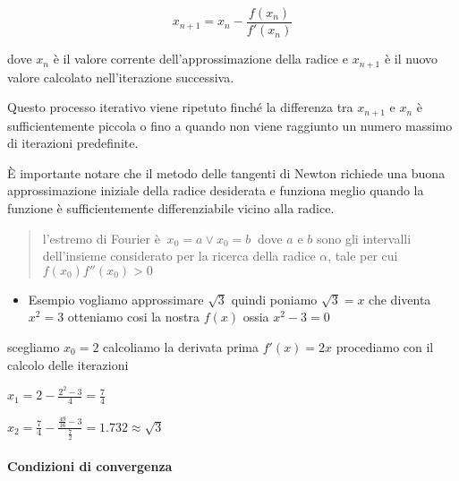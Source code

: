 \documentclass[
]{article}
\providecommand{\tightlist}{%
  \setlength{\itemsep}{0pt}\setlength{\parskip}{0pt}}
\begin{document}
\[
x_{n+1} = x_n - \frac{f(x_n)}{f'(x_n)}
\]

dove \(x_n\) è il valore corrente dell'approssimazione della radice e
\(x_{n+1}\) è il nuovo valore calcolato nell'iterazione successiva.

Questo processo iterativo viene ripetuto finché la differenza tra
\(x_{n+1}\) e \(x_n\) è sufficientemente piccola o fino a quando non
viene raggiunto un numero massimo di iterazioni predefinite.

È importante notare che il metodo delle tangenti di Newton richiede una
buona approssimazione iniziale della radice desiderata e funziona meglio
quando la funzione è sufficientemente differenziabile vicino alla
radice.

\begin{quote}
l'estremo di Fourier è \(\boxed{\ x_0=a\vee x_0=b \ }\) dove \(a\) e
\(b\) sono gli intervalli dell'insieme considerato per la ricerca della
radice \(\alpha\), tale per cui \(f(x_{0})f''(x_{0}) > 0\)
\end{quote}

\begin{itemize}
\tightlist
\item
  Esempio vogliamo approssimare \(\sqrt{ 3 }\) quindi poniamo
  \(\sqrt{ 3 } = x\) che diventa \(x^{2} = 3\) otteniamo cosi la nostra
  \(f(x)\) ossia \(x^{2}-3 = 0\)
\end{itemize}

scegliamo \(x_{0} = 2\) calcoliamo la derivata prima \(f'(x) = 2x\)
procediamo con il calcolo delle iterazioni

\(x_{1} = 2-\frac{2^{2}-3}{4} = \frac{7}{4}\)

\(x_{2} = \frac{7}{4} - \frac{\frac{49}{16}-3}{\frac{7}{2}} = 1.732 \approx{\sqrt{ 3 }}\)

\paragraph{Condizioni di convergenza}\label{condizioni-di-convergenza}
\end{document}
